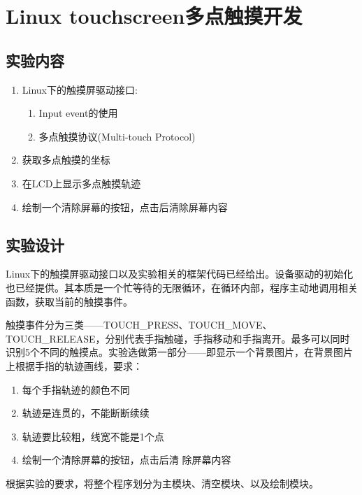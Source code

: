 \documentclass{report}
\begin{document}
\chapter{Linux touchscreen多点触摸开发}
\section{实验内容}
\begin{enumerate}
    \item Linux下的触摸屏驱动接口:
        \begin{enumerate}
            \item Input event的使用
            \item 多点触摸协议(Multi-touch Protocol)
        \end{enumerate}
    \item 获取多点触摸的坐标
    \item 在LCD上显示多点触摸轨迹
    \item 绘制一个清除屏幕的按钮，点击后清除屏幕内容
\end{enumerate}
\section{实验设计}
\par Linux下的触摸屏驱动接口以及实验相关的框架代码已经给出。设备驱动的初始化也已经提供。其本质是一个忙等待的无限循环，在循环内部，程序主动地调用相关函数，获取当前的触摸事件。
\par 触摸事件分为三类——TOUCH\_PRESS、TOUCH\_MOVE、TOUCH\_RELEASE，分别代表手指触碰，手指移动和手指离开。最多可以同时识别5个不同的触摸点。实验选做第一部分——即显示一个背景图片，在背景图片上根据手指的轨迹画线，要求：
\begin{enumerate}
    \item 每个手指轨迹的颜色不同
    \item 轨迹是连贯的，不能断断续续
    \item 轨迹要比较粗，线宽不能是1个点
    \item 绘制一个清除屏幕的按钮，点击后清 除屏幕内容
\end{enumerate}
根据实验的要求，将整个程序划分为主模块、清空模块、以及绘制模块。
\end{document}

